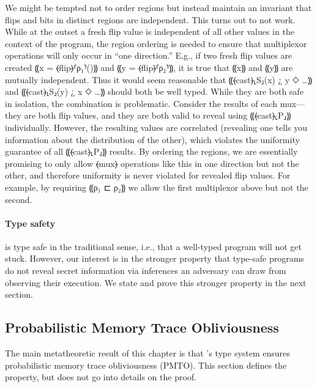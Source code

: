 We might be tempted not to order regions but instead
maintain an invariant that flips and bits
in distinct regions are independent. This turns out to not work.
%
While at the outset a fresh flip value is independent of all other
values in the context of the program, the region ordering is needed to
ensure that multiplexor operations will only occur in ``one direction.''
{E.g.}, if two fresh flip values are created ⸨x = ⦑flip⦒⸢ρ₁⸣()⸩ and ⸨y
= ⦑flip⦒⸢ρ₂⸣⸩, it is true that ⸨x⸩ and ⸨y⸩ are mutually independent. Thus it would
seem reasonable that ⸨⦑cast⦒⸤S⸥(x) ¿ y ◇ …⸩ and
⸨⦑cast⦒⸤S⸥(y) ¿ x ◇ …⸩ should both be well typed. While they are
both safe in isolation, the combination is problematic. Consider the
results of each mux---they are both flip values, and they are both
valid to reveal using ⸨⦑cast⦒⸤P⸥⸩ individually. However, the resulting
values are correlated (revealing one tells you information about the
distribution of the other), which violates the uniformity guarantee of
all ⸨⦑cast⦒⸤P⸥⸩ results. By ordering the regions, we are essentially
promising to only allow ⦑mux⦒ operations like this in one direction
but not the other, and therefore uniformity is never violated for
revealed flip values. For example, by requiring ⸨ρ₁ ⊏ ρ₂⸩ we allow the
first multiplexor above but not the second.

\paragraph*{Type safety}

\obliv is type safe in the traditional sense, i.e., that a well-typed
program will not get stuck. However, our interest is in the stronger
property that type-safe \obliv programs do not reveal secret
information via inferences an adversary can draw from observing their
execution. We state and prove this stronger property in the next section.


\subsection{Probabilistic Memory Trace Obliviousness}
\label{subsec:obliv-design-pmto}

The main metatheoretic result of this chapter is that \obliv's type
system ensures probabilistic memory trace obliviousness (PMTO). This
section defines the property, but does not go into details on the proof.

